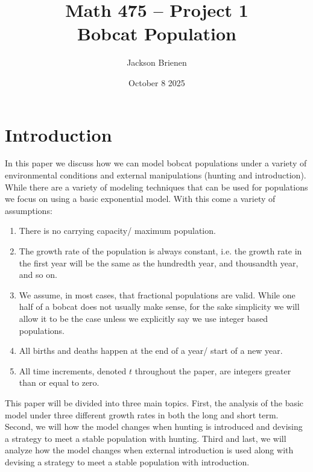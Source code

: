 \documentclass{article}
\title{Math 475 -- Project 1 \\ Bobcat Population}
\author{Jackson Brienen}
\date{October 8 2025}
\begin{document}
\maketitle

\section{Introduction}
In this paper we discuss how we can model bobcat populations under a variety of environmental conditions and external manipulations (hunting and introduction). While there are a variety of modeling techniques that can be used for populations we focus on using a basic exponential model. With this come a variety of assumptions:

\begin{enumerate}
    \item There is no carrying capacity/ maximum population.
    \item The growth rate of the population is always constant, i.e. the growth rate in the first year will be the same as the hundredth year, and thousandth year, and so on.
    \item We assume, in most cases, that fractional populations are valid. While one half of a bobcat does not usually make sense, for the sake simplicity we will allow it to be the case unless we explicitly say we use integer based populations.
    \item All births and deaths happen at the end of a year/ start of a new year.
    \item All time increments, denoted $t$ throughout the paper, are integers greater than or equal to zero.
\end{enumerate}

This paper will be divided into three main topics. First, the analysis of the basic model under three different growth rates in both the long and short term. Second, we will how the model changes when hunting is introduced and devising a strategy to meet a stable population with hunting. Third and last, we will analyze how the model changes when external introduction is used along with devising a strategy to meet a stable population with introduction.

\end{document}
